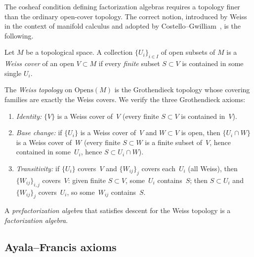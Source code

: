 The cosheaf condition defining factorization algebras requires a topology
finer than the ordinary open-cover topology. The correct notion,
introduced by Weiss~\cite{Wei99} in the context of manifold calculus and
adopted by Costello--Gwilliam~\cite{CG17}, is the following.

\begin{definition}\label{def:weiss-cover}
Let $M$ be a topological space. A collection $\{U_i\}_{i \in I}$ of open
subsets of $M$ is a \emph{Weiss cover} of an open $V \subset M$ if every
\emph{finite} subset $S \subset V$ is contained in some single $U_i$.
\end{definition}

The \emph{Weiss topology} on $\mathrm{Opens}(M)$ is the
Grothendieck topology whose covering families are exactly the
Weiss covers. We verify the three Grothendieck axioms:
\begin{enumerate}[label=\textup{(\roman*)}]
\item \emph{Identity:} $\{V\}$ is a Weiss cover of~$V$ (every
 finite $S \subset V$ is contained in~$V$).
\item \emph{Base change:} if $\{U_i\}$ is a Weiss cover
 of~$V$ and $W \subset V$ is open, then $\{U_i \cap W\}$
 is a Weiss cover of~$W$ (every finite $S \subset W$ is
 a finite subset of~$V$, hence contained in some~$U_i$,
 hence $S \subset U_i \cap W$).
\item \emph{Transitivity:} if $\{U_i\}$ covers~$V$ and
 $\{W_{ij}\}_j$ covers each~$U_i$ (all Weiss), then
 $\{W_{ij}\}_{i,j}$ covers~$V$: given finite $S \subset V$,
 some~$U_i$ contains~$S$; then $S \subset U_i$ and
 $\{W_{ij}\}_j$ covers~$U_i$, so some~$W_{ij}$
 contains~$S$.
\end{enumerate}
A \emph{prefactorization algebra} that satisfies descent for the Weiss
topology is a \emph{factorization algebra}.

\subsection{Ayala--Francis axioms}


